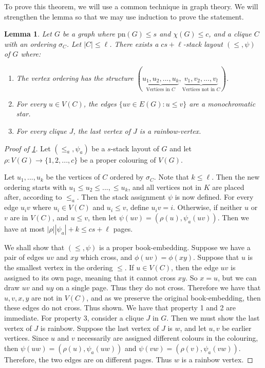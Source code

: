 \documentclass[]{report}
\newcommand{\pn}{\text{pn}}
\newtheorem{lemma}[theorem]{Lemma}
\theoremstyle{definition}
\numberwithin{theorem}{section}
\numberwithin{equation}{section}
\begin{document}
To prove this theorem, we will use a common technique in graph theory. We will strengthen the lemma so that we may use induction to prove the statement.
\begin{lemma}\label{lem:Hickingbotham_Lemma}
	Let $G$ be a graph where $\pn(G) \leq s$ and $\chi(G) \leq c$, and a clique $C$ with an ordering $\sigma_C$. Let $|C| \leq \ell$. There exists a $cs + \ell$-stack layout $(\leq, \psi)$ of $G$ where:
	\begin{enumerate}
		\item The vertex ordering has the structure $(\underbrace{u_1, u_2, ..., u_k}_{\text{Vertices in } C}, \underbrace{v_1, v_2, ..., v_l}_{\text{Vertices not in }C})$. 
		\item For every $u \in V(C)$, the edges $\lbrace uv \in E(G) : u \leq v \rbrace$ are a monochromatic star. 
		\item For every clique $J$, the last vertex of $J$ is a rainbow-vertex. 
	\end{enumerate}
\end{lemma}
\begin{proof}[Proof of \cref{lem:Hickingbotham_Lemma}]
	Let $(\leq_a, \psi_a)$ be a $s$-stack layout of $G$ and let $\rho: V(G) \rightarrow \lbrace 1, 2, ..., c\rbrace$ be a proper colouring of $V(G)$.

Let $u_1, ..., u_k$ be the vertices of $C$ ordered by $\sigma_C$. Note that $k \leq \ell$. Then the new ordering starts with $u_1 \leq u_2 \leq ..., \leq u_k$, and all vertices not in $K$ are placed after, according to $\leq_a$.
Then the stack assignment $\psi$ is now defined. For every edge $u_i v$ where $u_i \in V(C)$ and $u_i \leq v$, define $u_i v = i$. Otherwise, if neither $u$ or $v$ are in $V(C)$, and $u \leq v$, then let $\psi(uv) = (\rho(u), \psi_a(uv))$. Then we have at most $|\rho| |\psi_a| + k \leq cs + \ell$ pages.

We shall show that $(\leq, \psi)$ is a proper book-embedding. Suppose we have a pair of edges $uv$ and $xy$ which cross, and $\phi(uv) = \phi(xy)$. Suppose that $u$ is the smallest vertex in the ordering $\leq$. If $u \in V(C)$, then the edge $uv$ is assigned to its own page, meaning that it cannot cross $xy$. So $x = u$, but we can draw $uv$ and $uy$ on a single page. Thus they do not cross. Therefore we have that $u, v, x, y$ are not in $V(C)$, and as we preserve the original book-embedding, then these edges do not cross. Thus shown.
We have that property 1 and 2 are immediate. For property 3, consider a clique $J$ in $G$. Then we must show the last vertex of $J$ is rainbow. Suppose the last vertex of $J$ is $w$, and let $u, v$ be earlier vertices. Since $u$ and $v$ necessarily are assigned different colours in the colouring, then $\psi(uw) = (\rho(u), \psi_a(uw))$ and $\psi(vw) = (\rho(v), \psi_a(vw))$. Therefore, the two edges are on different pages. Thus $w$ is a rainbow vertex. 
\end{proof}
\end{document}
